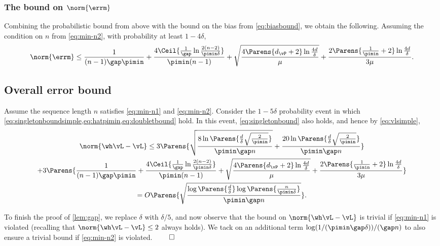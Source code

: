 \subsubsection{The bound on $\norm{\errm}$}
Combining the probabilistic bound from above with the bound on the
bias from \cref{eq:biasbound}, we obtain the following.
Assuming the condition on $n$ from \cref{eq:min-n2}, with probability
at least $1-4\delta$,
\begin{equation}
  \norm{\errm}
  \leq
  \frac{1}{(n-1)\gap\pimin}
  +
  \frac{4
    \Ceil{
      \frac{1}{\gap}\ln\frac{2(n-2)}{\pimin\delta}
    }
  }{\pimin(n-1)}
  +
  \sqrt{
    \frac{4\Parens{ d_{\vP} + 2 } \ln\frac{4d}{\delta}}
    {\mu}
  }
  + \frac{2\Parens{ \frac1{\pimin} + 2 } \ln\frac{4d}{\delta}}
  {3\mu}
  .
  \label{eq:doubletbound}
\end{equation}

\subsection{Overall error bound}
Assume the sequence length $n$ satisfies \cref{eq:min-n1} and
\cref{eq:min-n2}.
Consider the $1-5\delta$ probability event in which
\cref{eq:singletonboundsimple,eq:hatpimin,eq:doubletbound} hold.
In this event, \cref{eq:singletonbound} also holds, and hence by
\cref{eq:vlsimple},
\begin{multline*}
  \norm{\wh\vL - \vL}
  \leq
  3
  \Parens{
    \sqrt{
      \frac{
        8\ln\Parens{\frac{d}\delta\sqrt{\frac{2}{\pimin}}}
      }{
        \pimin\gap n
      }
    }
    +
    \frac{
      20\ln\Parens{\frac{d}\delta\sqrt{\frac{2}{\pimin}}}
    }{
      \pimin\gap n
    }
  }
  \\
  +
  3\Parens{
    \frac{1}{(n-1)\gap\pimin}
    +
    \frac{4
      \Ceil{
        \frac{1}{\gap}\ln\frac{2(n-2)}{\pimin\delta}
      }
    }{\pimin(n-1)}
    +
    \sqrt{
      \frac{4\Parens{ d_{\vP} + 2 } \ln\frac{4d}{\delta}}
      {\mu}
    }
    + \frac{2\Parens{ \frac1{\pimin} + 2 } \ln\frac{4d}{\delta}}
    {3\mu}
  }
  \\
  =
  O
  \Parens{
    \sqrt{
      \frac{
        \log\Parens{\frac{d}{\delta}}
        \log\Parens{\frac{n}{\pimin\delta}}
      }{\pimin\gap n}
    }
  }
  .
\end{multline*}

To finish the proof of \cref{lem:gap}, we replace $\delta$ with
$\delta/5$, and now observe that the bound on $\norm{\wh\vL-\vL}$ is
trivial if \cref{eq:min-n1} is violated (recalling that
$\norm{\wh\vL-\vL} \leq 2$ always holds).
We tack on an additional term $\log(1/(\pimin\gap\delta)) / (\gap n)$
to also ensure a trivial bound if \cref{eq:min-n2} is violated.
\hfill $\qed$

